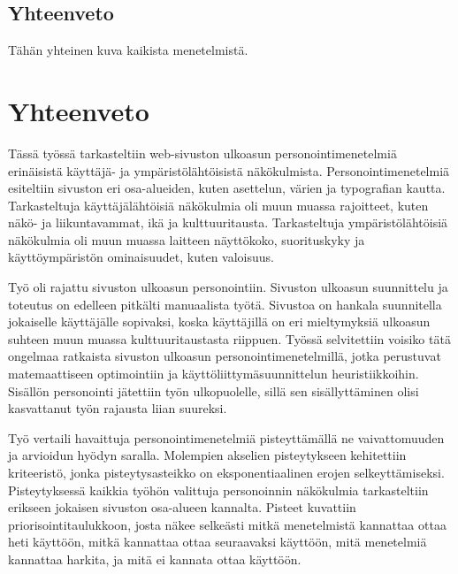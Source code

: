 \documentclass[finnish, 12pt, a4paper, elec, utf8, a-1b, online]{aaltothesis}
\begin{document}
\subsection{Yhteenveto}

Tähän yhteinen kuva kaikista menetelmistä.

\clearpage

\section{Yhteenveto}

Tässä työssä tarkasteltiin web-sivuston ulkoasun personointimenetelmiä
erinäisistä käyttäjä- ja ympäristölähtöisistä näkökulmista.
Personointimenetelmiä esiteltiin sivuston eri osa-alueiden, kuten asettelun,
värien ja typografian kautta. Tarkasteltuja käyttäjälähtöisiä näkökulmia oli
muun muassa rajoitteet, kuten näkö- ja liikuntavammat, ikä ja kulttuuritausta.
Tarkasteltuja ympäristölähtöisiä näkökulmia oli muun muassa laitteen näyttökoko,
suorituskyky ja käyttöympäristön ominaisuudet, kuten valoisuus.

Työ oli rajattu sivuston ulkoasun personointiin. Sivuston ulkoasun suunnittelu
ja toteutus on edelleen pitkälti manuaalista työtä. Sivustoa on hankala
suunnitella jokaiselle käyttäjälle sopivaksi, koska käyttäjillä on eri
mieltymyksiä ulkoasun suhteen muun muassa kulttuuritaustasta riippuen. Työssä
selvitettiin voisiko tätä ongelmaa ratkaista sivuston ulkoasun
personointimenetelmillä, jotka perustuvat matemaattiseen optimointiin ja
käyttöliittymäsuunnittelun heuristiikkoihin. Sisällön personointi jätettiin
työn ulkopuolelle, sillä sen sisällyttäminen olisi kasvattanut työn rajausta
liian suureksi.

Työ vertaili havaittuja personointimenetelmiä pisteyttämällä ne vaivattomuuden
ja arvioidun hyödyn saralla. Molempien akselien pisteytykseen kehitettiin
kriteeristö, jonka pisteytysasteikko on eksponentiaalinen erojen
selkeyttämiseksi. Pisteytyksessä kaikkia työhön valittuja personoinnin
näkökulmia tarkasteltiin erikseen jokaisen sivuston osa-alueen kannalta. Pisteet
kuvattiin priorisointitaulukkoon, josta näkee selkeästi mitkä menetelmistä
kannattaa ottaa heti käyttöön, mitkä kannattaa ottaa seuraavaksi käyttöön, mitä
menetelmiä kannattaa harkita, ja mitä ei kannata ottaa käyttöön.
\end{document}

